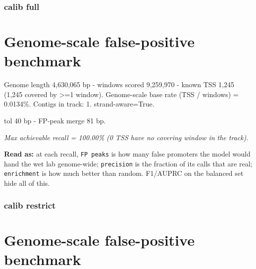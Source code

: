 \documentclass[10pt]{article}
\begin{document}
\subsubsection*{calib \textperiodcentered{} full}
\section*{Genome-scale false-positive benchmark}

Genome length 4,630,065 bp - windows scored 9,259,970 - known TSS 1,245 (1,245 covered by >=1 window). Genome-scale base rate (TSS / windows) = 0.0134\%. Contigs in track: 1. strand-aware=True.

tol 40 bp - FP-peak merge 81 bp.

\begin{center}
\end{center}

{\itshape Max achievable recall = 100.00\% (0 TSS have no covering window in the track).}

\textbf{Read as:} at each recall, \texttt{FP peaks} is how many false promoters the model would hand the wet lab genome-wide; \texttt{precision} is the fraction of its calls that are real; \texttt{enrichment} is how much better than random. F1/AUPRC on the balanced set hide all of this.

\subsubsection*{calib \textperiodcentered{} restrict}
\section*{Genome-scale false-positive benchmark}
\end{document}
